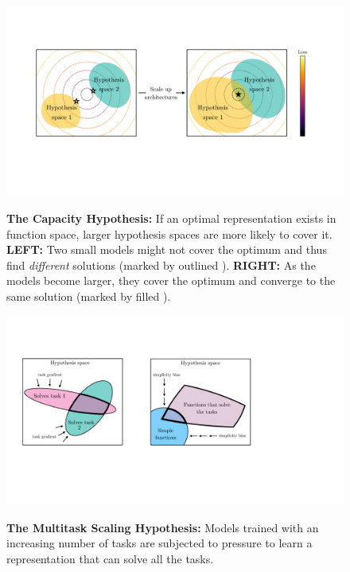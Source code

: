 \documentclass{article}
\theoremstyle{plain}
\theoremstyle{definition}
\theoremstyle{remark}
\begin{document}
\begin{figure}[t]
    \centering
    \vspace{3pt}
    \includegraphics[width=0.945\linewidth, trim=0 0 12 0]{figures/hypothesis_space_overlap.pdf}\\[-8pt]
    \caption{\small \textbf{The Capacity Hypothesis:} If an optimal representation exists in function space, larger hypothesis spaces are more likely to cover it. \textbf{LEFT:} Two small models might not cover the optimum and thus find \textit{different} solutions (marked by outlined \scalebox{1.25}{$\bigwhitestar$}). \textbf{RIGHT:} As the models become larger, they cover the optimum and converge to the same solution (marked by filled \scalebox{1.05}{$\bigstar$}).}
    \label{fig:hypothesis_space_overlap}%
    \vspace{-5pt}
\end{figure}

\begin{figure}[t]
    \centering
    \vspace{3pt}
    \includegraphics[width=0.825\linewidth]{figures/multitask_hypothesis.pdf}\\[-7pt]
    \caption{\small \textbf{The Multitask Scaling Hypothesis:} Models trained with an increasing number of tasks are subjected to pressure to learn a representation that can solve all the tasks.} \label{fig:multitask_hypothesis}
\end{figure}
\end{document}
